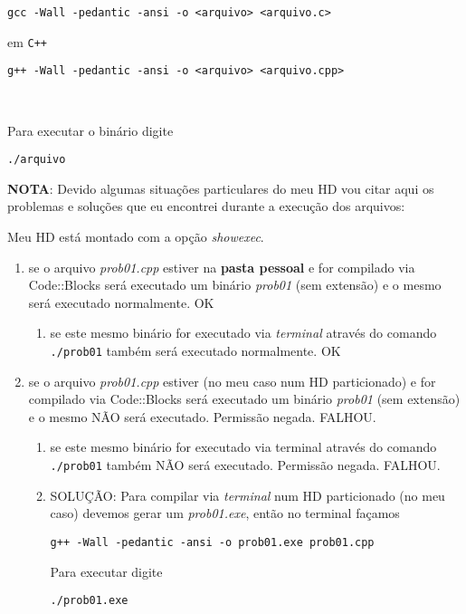 \documentclass[a4paper]{memoir}
\begin{document}
\verb|gcc -Wall -pedantic -ansi -o <arquivo> <arquivo.c>|

em \texttt{C++}

\verb|g++ -Wall -pedantic -ansi -o <arquivo> <arquivo.cpp>|

\

Para executar o binário digite

\verb|./arquivo|

\textbf{NOTA}: Devido algumas situações particulares do meu HD vou citar aqui os problemas e soluções que eu encontrei durante a execução dos arquivos:

Meu HD está montado com a opção \emph{showexec}.

\begin{enumerate}
 \item se o arquivo \emph{prob01.cpp} estiver na \textbf{pasta pessoal} e for compilado via Code::Blocks será executado um binário \emph{prob01} (sem extensão) e o mesmo será executado normalmente. OK

 \begin{enumerate}
  \item se este mesmo binário for executado via \emph{terminal} através do comando \verb|./prob01| também será executado normalmente. OK
 \end{enumerate}

 \item se o arquivo \emph{prob01.cpp} estiver (no meu caso num HD particionado) e for compilado via Code::Blocks será executado um binário \emph{prob01} (sem extensão) e o mesmo NÃO será executado. Permissão negada. FALHOU.

 \begin{enumerate}
  \item se este mesmo binário for executado via terminal através do comando \verb|./prob01| também NÃO será executado. Permissão negada. FALHOU.
  \item SOLUÇÃO: Para compilar via \emph{terminal} num HD particionado (no meu caso) devemos gerar um \emph{prob01.exe}, então no terminal façamos

  \verb|g++ -Wall -pedantic -ansi -o prob01.exe prob01.cpp|

Para executar digite

\verb|./prob01.exe|

 \end{enumerate}

\end{enumerate}

\
\end{document}

